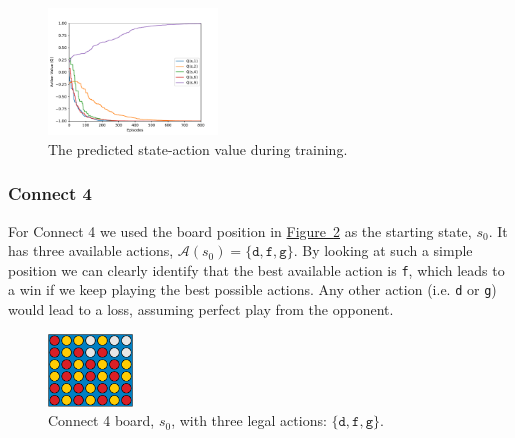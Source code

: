 \documentclass{article}
\newcommand{\GithubURL}[1]{[\href{https://github.com/davidrobles/mlnd-capstone-code/blob/master/#1}{source}]}
\begin{document}
\begin{figure}[!h]
    \centering
    \includegraphics[width=0.40\textwidth]{figures/tic_ql_tab_action_values.pdf}
    \caption{The predicted state-action value during training.}
    \label{fig:tic-ql-tab-qvalues-progress}
\end{figure}

\subsubsection{Connect 4}



For Connect 4 we used the board position in \hyperref[fig:c4-ql-tab-cur]
{Figure~\ref*{fig:c4-ql-tab-cur}} as the starting state, $s_0$. It has three available actions,
$\mathcal{A}(s_0) = \{\texttt{d}, \texttt{f}, \texttt{g}\}$. By looking at such a simple position we
can clearly identify that the best available action is \texttt{f}, which leads to a win if we keep
playing the best possible actions.  Any other action (i.e. \texttt{d} or \texttt{g}) would lead to a
loss, assuming perfect play from the opponent.


\begin{figure}[!h]
    \centering
    \includegraphics[width=0.2\textwidth]{figures/c4_ql_tab_current.pdf}
    \caption{Connect 4 board, $s_0$, with three legal actions: $\{\texttt{d}, \texttt{f}, \texttt{g}\}$.}
    \label{fig:c4-ql-tab-cur}
\end{figure}
\end{document}
